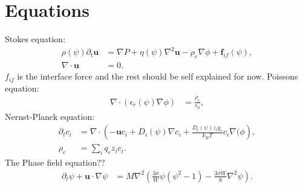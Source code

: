 \documentclass[a4paper,10pt]{article}
\renewcommand{\v}[1]{\mathbf{#1}}
\renewcommand{\v}[1]{\ensuremath{\mathbf{#1}}} %
\begin{document}
\section{Equations}
Stokes equation:
\begin{align}
\rho(\psi) \partial_t \v{u}  &=  \nabla P +\eta(\psi) \nabla^2 \mathbf{u} -  \rho_e  \nabla \phi + \mathbf{f}_{if}(\psi),  \\  
\nabla \cdot\mathbf{u} &= 0.
\end{align}
$f_{if}$ is the interface force and the rest should be self explained for now. \newline
Poissons equation: 
\begin{align}
\nabla\cdot\left(\epsilon_r(\psi)\nabla\phi\right) &= \frac{\rho_e}{\epsilon_0 },
\end{align}
Nernst-Planck equation:
\begin{align}
\partial_t c_i  &=  \nabla  \cdot  \left( - \mathbf{u} c_i  + D_i(\psi) \nabla c_i  +   \frac{D_i(\psi) z_i q_e}{k_B T} c_i \nabla( \phi \right), \\
\rho_e &= \sum_i q_e z_i c_i. 
\end{align}
The Phase field equation?? 
\begin{align}
\partial_t \psi + \mathbf{u}\cdot\nabla\psi &= M\nabla^2\left(\frac{3 \sigma }{W} \psi \left(\psi^2 -1\right) - \frac{3 \sigma W}{8}\nabla^2 \psi\right).
\end{align}
\end{document}
